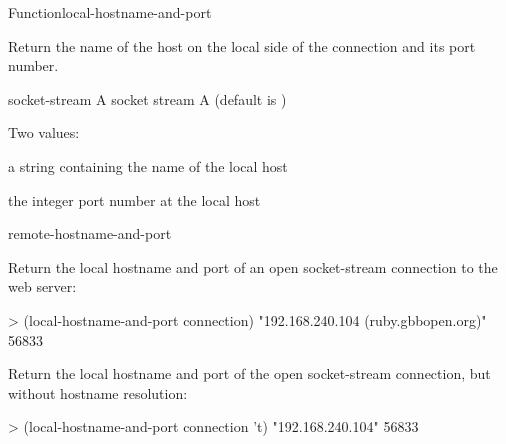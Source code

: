 \documentclass[10pt,twoside,english,pdftex]{article}
\begin{document}
\begin{functiondoc}{Function}{local-hostname-and-port}%
  {
      
    \mbox{\returns{} }}
%
%
%
%

\fnsyntax

\fnpurpose Return the name of the host on the local side of the
 connection and its port number.

\fnpackage {}

\fnmodule {}

\fnargs
\begin{args}{socket-stream}
 A socket stream
 A  (default is \nil)
\end{args}

\fnreturns Two values:
\begin{tightitemize}
\item a string containing the name of the local host
\item the integer port number at the local host
\end{tightitemize}

\begin{alsos}{remote-hostname-and-port}
\end{alsos}

\fnexamples
Return the local hostname and port of an open socket-stream
connection to the  web server:
%
\W\supp
\begin{example}
> (local-hostname-and-port connection)
"192.168.240.104 (ruby.gbbopen.org)"
56833
\end{example}
%
Return the local hostname and port of the open socket-stream
connection, but without hostname resolution:
%
\W\supp\notpretop
\begin{example}
> (local-hostname-and-port connection 't)
"192.168.240.104"
56833
\end{example}

\end{functiondoc}

\end{document}
